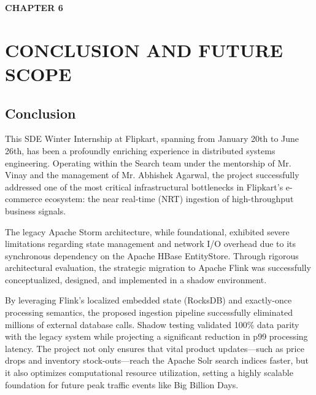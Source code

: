 \newpage
\textbf{\huge CHAPTER 6}\\
\section{CONCLUSION AND FUTURE SCOPE} \setcounter{section}{6}
\subsection{Conclusion}\setcounter{subsection}{1}
\begin{justify}
    This SDE Winter Internship at Flipkart, spanning from January 20th to June 26th, has been a profoundly enriching experience in distributed systems engineering. Operating within the Search team under the mentorship of Mr. Vinay and the management of Mr. Abhishek Agarwal, the project successfully addressed one of the most critical infrastructural bottlenecks in Flipkart's e-commerce ecosystem: the near real-time (NRT) ingestion of high-throughput business signals.

    The legacy Apache Storm architecture, while foundational, exhibited severe limitations regarding state management and network I/O overhead due to its synchronous dependency on the Apache HBase EntityStore. Through rigorous architectural evaluation, the strategic migration to Apache Flink was successfully conceptualized, designed, and implemented in a shadow environment. 

    By leveraging Flink's localized embedded state (RocksDB) and exactly-once processing semantics, the proposed ingestion pipeline successfully eliminated millions of external database calls. Shadow testing validated 100\% data parity with the legacy system while projecting a significant reduction in p99 processing latency. The project not only ensures that vital product updates—such as price drops and inventory stock-outs—reach the Apache Solr search indices faster, but it also optimizes computational resource utilization, setting a highly scalable foundation for future peak traffic events like Big Billion Days.
\end{justify}

\vspace{0.25cm}

